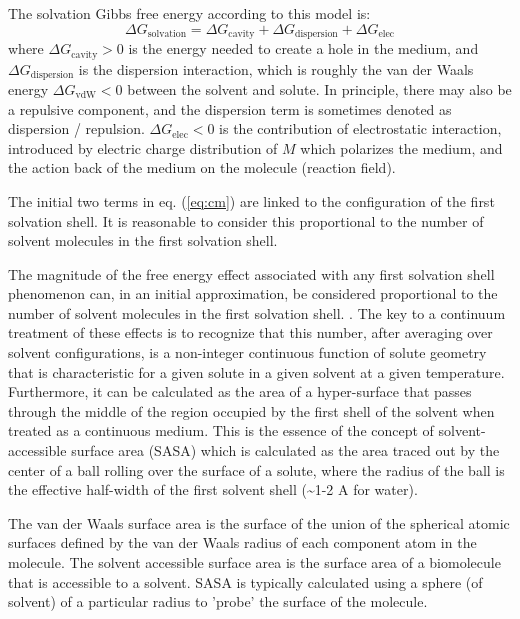 The solvation Gibbs free energy according to this model is:
\begin{equation}
\Delta G_{\mathrm{solvation}}=\Delta G_{\mathrm{cavity}}+\Delta G_{\mathrm{dispersion}}+\Delta G_{\mathrm{elec}}\label{eq:cm}
\end{equation}
where $\Delta G_{\mathrm{cavity}}>0$ is the energy needed to create
a hole in the medium, and $\Delta G_{\mathrm{dispersion}}$ is the
dispersion interaction, which is roughly the van der Waals energy
$\Delta G_{\mathrm{vdW}}<0$ between the solvent and solute. In principle,
there may also be a repulsive component, and the dispersion term is sometimes
denoted as dispersion / repulsion. $\Delta G_{\mathrm{elec}}<0$ is the
contribution of electrostatic interaction, introduced by electric
charge distribution of $M$ which polarizes the medium, and the action
back of the medium on the molecule (reaction field). 

The initial two terms in eq. (\ref{eq:cm}) are linked to the configuration
of the first solvation shell. It is reasonable to consider this proportional
to the number of solvent molecules in the first solvation shell.

The magnitude of the free energy effect associated with any first solvation shell
phenomenon can, in an initial approximation, be considered proportional
to the number of solvent molecules in the first solvation shell. \citep{Cramer_1999_implicit_model}.
The key to a continuum treatment of these effects is to recognize
that this number, after averaging over solvent configurations, is
a non-integer continuous function of solute geometry that is characteristic
for a given solute in a given solvent at a given temperature. Furthermore,
it can be calculated as the area of a hyper-surface that passes through
the middle of the region occupied by the first shell of the solvent when
treated as a continuous medium. This is the essence of the concept of solvent-accessible surface
area (SASA) \citep{SAS_1,SAS_2} which is calculated as the area
traced out by the center of a ball rolling over the surface of a solute,
where the radius of the ball is the effective half-width of the first
solvent shell (\textasciitilde{}1-2 A for water). 

The van der Waals surface area is the surface of the union of the
spherical atomic surfaces defined by the van der Waals radius of each
component atom in the molecule. The solvent accessible surface area
 is the surface area of a biomolecule that is accessible to
a solvent. SASA is typically calculated using a sphere (of solvent)
of a particular radius to 'probe' the surface of the molecule. 

